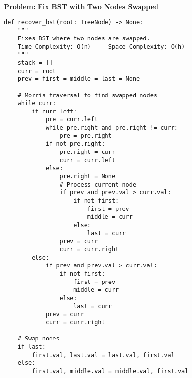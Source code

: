 \noindent\textbf{Problem: Fix BST with Two Nodes Swapped}
\begin{verbatim}
def recover_bst(root: TreeNode) -> None:
    """
    Fixes BST where two nodes are swapped.
    Time Complexity: O(n)     Space Complexity: O(h)
    """
    stack = []
    curr = root
    prev = first = middle = last = None
    
    # Morris traversal to find swapped nodes
    while curr:
        if curr.left:
            pre = curr.left
            while pre.right and pre.right != curr:
                pre = pre.right
            if not pre.right:
                pre.right = curr
                curr = curr.left
            else:
                pre.right = None
                # Process current node
                if prev and prev.val > curr.val:
                    if not first:
                        first = prev
                        middle = curr
                    else:
                        last = curr
                prev = curr
                curr = curr.right
        else:
            if prev and prev.val > curr.val:
                if not first:
                    first = prev
                    middle = curr
                else:
                    last = curr
            prev = curr
            curr = curr.right
    
    # Swap nodes
    if last:
        first.val, last.val = last.val, first.val
    else:
        first.val, middle.val = middle.val, first.val
\end{verbatim}

